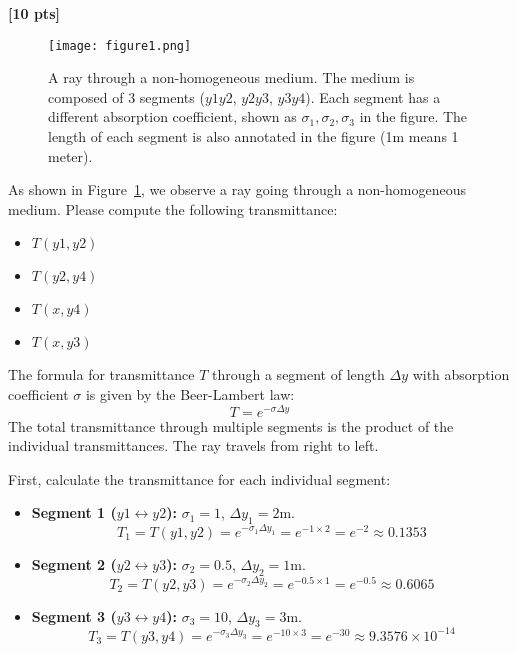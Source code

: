 \documentclass[11pt,addpoints,answers]{exam}
\begin{document}
\begin{questions}
\question \textbf{[10 pts]}
\begin{figure}[h]
    \centering
    \texttt{[image: figure1.png]}
    \caption{A ray through a non-homogeneous medium. The medium is composed of 3 segments ($y1y2$, $y2y3$, $y3y4$). Each segment has a different absorption coefficient, shown as $\sigma_1, \sigma_2, \sigma_3$ in the figure. The length of each segment is also annotated in the figure (1m means 1 meter).}
    \label{fig:q1}
\end{figure}

As shown in Figure~\ref{fig:q1}, we observe a ray going through a non-homogeneous medium. 
Please compute the following transmittance:
\begin{itemize}
    \item $T(y1, y2)$
    \item  $T(y2, y4)$
    \item $T(x, y4)$
    \item $T(x, y3)$
\end{itemize} 



\begin{tcolorbox}[fit,height=20cm, width=\textwidth, blank, borderline={0.5pt}{-2pt},halign=left, valign=center, nobeforeafter]


\begin{studentsolution}
    The formula for transmittance $T$ through a segment of length $\Delta y$ with absorption coefficient $\sigma$ is given by the Beer-Lambert law:
    \[ T = e^{-\sigma \Delta y} \]
    The total transmittance through multiple segments is the product of the individual transmittances. The ray travels from right to left.
    
    First, calculate the transmittance for each individual segment:
    \begin{itemize}
        \item \textbf{Segment 1 ($y1 \leftrightarrow y2$):} $\sigma_1 = 1$, $\Delta y_1 = 2\text{m}$.
        \[ T_{1} = T(y1, y2) = e^{-\sigma_1 \Delta y_1} = e^{-1 \times 2} = e^{-2} \approx 0.1353 \]
        \item \textbf{Segment 2 ($y2 \leftrightarrow y3$):} $\sigma_2 = 0.5$, $\Delta y_2 = 1\text{m}$.
        \[ T_{2} = T(y2, y3) = e^{-\sigma_2 \Delta y_2} = e^{-0.5 \times 1} = e^{-0.5} \approx 0.6065 \]
        \item \textbf{Segment 3 ($y3 \leftrightarrow y4$):} $\sigma_3 = 10$, $\Delta y_3 = 3\text{m}$.
        \[ T_{3} = T(y3, y4) = e^{-\sigma_3 \Delta y_3} = e^{-10 \times 3} = e^{-30} \approx 9.3576 \times 10^{-14} \]
    \end{itemize}
    

\end{studentsolution}
\end{tcolorbox}
\end{questions}
\end{document}
